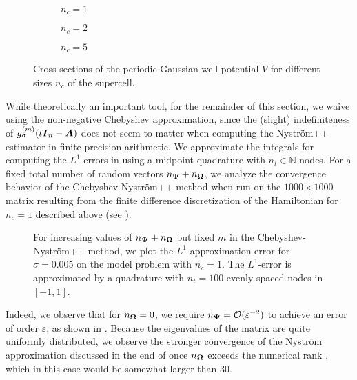 \begin{figure}[ht]
    \begin{subfigure}[b]{0.32\columnwidth}
        
        \caption{$n_c=1$}
        \label{fig:gaussian-well-1}
    \end{subfigure}
    \begin{subfigure}[b]{0.32\columnwidth}
        
        \caption{$n_c=2$}
        \label{fig:gaussian-well-2}
    \end{subfigure}
    \begin{subfigure}[b]{0.32\columnwidth}
        
        \caption{$n_c=5$}
        \label{fig:gaussian-well-5}
    \end{subfigure}
    \caption{Cross-sections of the periodic Gaussian well potential $V$ for different sizes $n_c$ of the supercell.}
    \label{fig:gaussian-well}
\end{figure}

While theoretically an important tool, for the remainder of this section, we waive using the non-negative Chebyshev approximation, since the (slight) indefiniteness of $g_{\sigma}^{(m)}(t \boldsymbol{I}_n - \boldsymbol{A})$  does not seem to matter when computing the Nyström++ estimator in finite precision arithmetic. We approximate the integrals for computing the $L^1$-errors in  using a midpoint quadrature with $n_t \in \mathbb{N}$ nodes. For a fixed total number of random vectors $n_{\boldsymbol{\Psi}} + n_{\boldsymbol{\Omega}}$, we analyze the convergence behavior of the Chebyshev-Nyström++ method when run on the $1000 \times 1000$ matrix resulting from the finite difference discretization of the Hamiltonian for $n_c = 1$ described above (see ). 

\begin{figure}[ht]
    \centering
    
    \caption{For increasing values of $n_{\boldsymbol{\Psi}} + n_{\boldsymbol{\Omega}}$ but fixed $m$ in the Chebyshev-Nyström++ method, we plot the $L^1$-approximation error for $\sigma=0.005$ on the model problem with $n_c = 1$. The $L^1$-error is approximated by a quadrature with $n_t = 100$ evenly spaced nodes in $[-1, 1]$.}
    \label{fig:convergence}
\end{figure}

Indeed, we observe that for $n_{\boldsymbol{\Omega}} = 0$, we require $n_{\boldsymbol{\Psi}} = \mathcal{O}(\varepsilon^{-2})$ to achieve an error of order $\varepsilon$, as shown in . Because the eigenvalues of the matrix are quite uniformly distributed, we observe the stronger convergence of the Nyström approximation discussed in the end of  once $n_{\boldsymbol{\Omega}}$ exceeds the numerical rank , which in this case would be somewhat larger than $30$.

